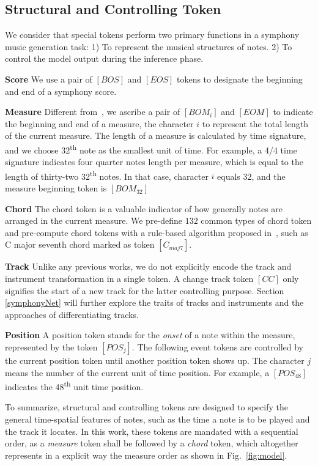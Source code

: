 \documentclass{article}
\begin{document}
\subsection{Structural and Controlling Token}
We consider that special tokens perform two primary functions in a symphony music generation task: 1) To represent the musical structures of notes. 2) To control the model output during the inference phase.

\textbf{Score} We use a pair of $[BOS]$ and $[EOS]$ tokens to designate the beginning and end of a symphony score.

\textbf{Measure} Different from~\cite{popmag,popmt}, we ascribe a pair of $[BOM_i]$ and $[EOM]$ to indicate the beginning and end of a measure, the character $i$ to represent the total length of the current measure. The length of a measure is calculated by time signature, and we choose 32\textsuperscript{th} note as the smallest unit of time. For example, a 4/4 time signature indicates four quarter notes length per measure, which is equal to the length of thirty-two 32\textsuperscript{th} notes. In that case, character $i$ equals 32, and the measure beginning token is $[BOM_{32}]$ 

\textbf{Chord} The chord token is a valuable indicator of how generally notes are arranged in the current measure. We pre-define $132$ common types of chord token and pre-compute chord tokens with a rule-based algorithm proposed in~\cite{cwt}, such as C major seventh chord marked as token $[C_{maj7}]$.

\textbf{Track} Unlike any previous works, we do not explicitly encode the track and instrument transformation in a single token. A change track token $[CC]$ only signifies the start of a new track for the latter controlling purpose. Section \ref{symphonyNet} will further explore the traits of tracks and instruments and the approaches of differentiating tracks.

\textbf{Position} A position token stands for the \emph{onset} of a note within the measure, represented by the token $[POS_j]$. The following event tokens are controlled by the current position token until another position token shows up. The character $j$ means the number of the current unit of time position. For example, a $[POS_{48}]$  indicates the 48\textsuperscript{th} unit time position.

To summarize, structural and controlling tokens are designed to specify the general time-spatial features of notes, such as the time a note is to be played and the track it locates. In this work, these tokens are mandated with a sequential order, as a \emph{measure} token shall be followed by a \emph{chord} token, which altogether represents in a explicit way the measure order as shown in Fig.~\ref{fig:model}.
\end{document}
